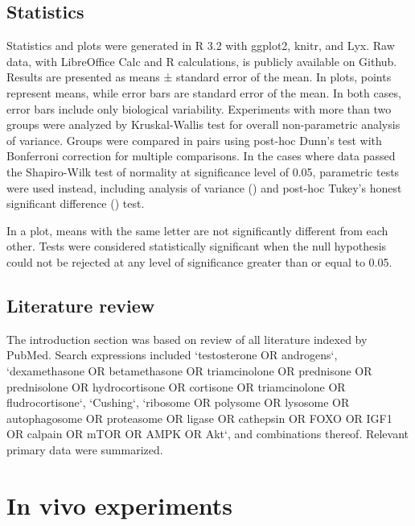 \documentclass[12pt,english]{report}\usepackage[]{graphicx}\usepackage[]{color}
\begin{document}
\section{Statistics}

Statistics and plots were generated in R 3.2 with ggplot2, knitr,
and Lyx\citep{stodden2014implementing}. Raw data, with LibreOffice
Calc and R calculations, is publicly available on Github. Results
are presented as means ± standard error of the mean. In plots, points
represent means, while error bars are standard error of the mean.
In both cases, error bars include only biological variability. Experiments
with more than two groups were analyzed by Kruskal-Wallis test for
overall non-parametric analysis of variance. Groups were compared
in pairs using post-hoc Dunn's test with Bonferroni correction for
multiple comparisons. In the cases where data passed the Shapiro-Wilk
test of normality at significance level of 0.05, parametric tests
were used instead, including analysis of variance ()
and post-hoc Tukey's honest significant difference ()
test.

In a plot, means with the same letter are not significantly different
from each other. Tests were considered statistically significant when
the null hypothesis could not be rejected at any level of significance
greater than or equal to 0.05.


\section{Literature review}

The introduction section was based on review of all literature indexed
by PubMed. Search expressions included `testosterone OR androgens`,
`dexamethasone OR betamethasone OR triamcinolone OR prednisone OR
prednisolone OR hydrocortisone OR cortisone OR triamcinolone OR fludrocortisone`,
`Cushing`, `ribosome OR polysome OR lysosome OR autophagosome OR proteasome
OR ligase OR cathepsin OR FOXO OR IGF1 OR calpain OR mTOR OR AMPK
OR Akt`, and combinations thereof. Relevant primary data were summarized.

\begin{singlespace}
\pagebreak{}
\end{singlespace}


\chapter{In vivo experiments}
\end{document}
